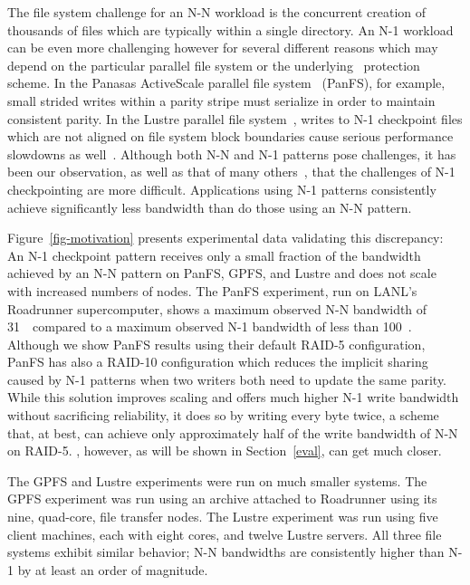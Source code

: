 

The file system challenge for an N-N workload is the concurrent creation of
thousands of files which are typically within a single directory.  An N-1
workload can be even more challenging however for several different reasons
which may depend on the particular parallel file system or the underlying
\RAID\ protection scheme.  In the Panasas ActiveScale parallel
file system~\cite{Welch04managingscalability} (PanFS), for example, small strided
writes within a parity stripe must serialize in order to maintain consistent
parity.  In the Lustre parallel file system~\cite{lustre}, writes to N-1
checkpoint files which are not aligned on file system block boundaries cause
serious performance slowdowns as well~\cite{nersc}.  Although both
N-N and N-1 patterns pose challenges, it has been our observation, as well
as that of many others~\cite{grider-hec,adios,nersc,zest,Thakur99datasieving},
that the challenges of N-1 checkpointing are more difficult. 
Applications using N-1 patterns consistently achieve significantly less
bandwidth than do those using an N-N pattern. 


Figure~\ref{fig-motivation} presents experimental data validating this discrepancy: An N-1 checkpoint pattern receives
only a small fraction of the bandwidth achieved by an N-N pattern on PanFS,
GPFS, and Lustre and does not scale with increased numbers of nodes.  The 
PanFS experiment, run on LANL's Roadrunner
supercomputer, shows a maximum observed N-N bandwidth of 31~\GBs\ compared
to a maximum observed N-1 bandwidth of less than 100~\MBs. 
Although we show PanFS results
using their default RAID-5 configuration, PanFS has also a RAID-10
configuration which reduces the implicit sharing caused by N-1 patterns when
two writers both need to update the same parity.  While this solution improves
scaling and offers much higher N-1 write bandwidth without sacrificing
reliability, it does so by writing every byte twice, a scheme that, at best,
can achieve only approximately half of the write bandwidth of N-N on RAID-5.
\plfs, however, as will be shown in Section~\ref{eval}, can get much closer.

The GPFS and Lustre experiments were run on much smaller systems. The GPFS
experiment was run using an archive attached to Roadrunner using its 
nine, quad-core, file transfer nodes.  The Lustre experiment was run using five
client machines, each with eight cores, and twelve Lustre servers.  All three
file systems exhibit similar behavior; N-N bandwidths are consistently higher
than N-1 by at least an order of magnitude.

